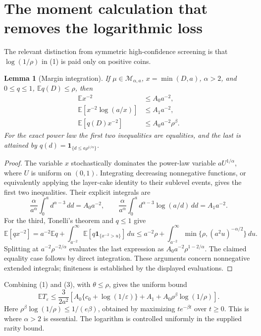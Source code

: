 \documentclass[11pt]{article}
\newtheorem{lemma}[theorem]{Lemma}
\newcommand{\E}{\mathbb E}
\newcommand{\ind}{\mathbf1}
\begin{document}
\section{The moment calculation that removes the logarithmic loss}
The relevant distinction from symmetric high-confidence screening is that
$\log(1/\rho)$ in (1) is paid only on positive coins.

\begin{lemma}[Margin integration]\label{lem:integration}
If $\mu\in\mathcal M_{\alpha,a}$, $x=\min(D,a)$, $\alpha>2$, and
$0\le q\le1$, $\E q(D)\le\rho$, then
\[
\begin{aligned}
 \E x^{-2}&\le A_0a^{-2},\\
 \E[x^{-2}\log(a/x)]&\le A_1a^{-2},\\
 \E[q(D)x^{-2}]&\le A_0a^{-2}\rho^\beta.
\end{aligned}                                           \tag{3}
\]
For the exact power law the first two inequalities are equalities, and the
last is attained by $q(d)=\ind_{\{d\le a\rho^{1/\alpha}\}}$.
\end{lemma}
\begin{proof}
The variable $x$ stochastically dominates the power-law variable $aU^{1/\alpha}$,
where $U$ is uniform on $(0,1)$. Integrating decreasing nonnegative functions,
or equivalently applying the layer-cake identity to their sublevel events,
gives the first two inequalities. Their explicit integrals are
\[
 \frac\alpha{a^\alpha}\int_0^a d^{\alpha-3}\,dd=A_0a^{-2},
 \qquad
 \frac\alpha{a^\alpha}\int_0^a d^{\alpha-3}\log(a/d)\,dd=A_1a^{-2}.
\]
For the third, Tonelli's theorem and $q\le1$ give
\[
 \E[qx^{-2}]
 =a^{-2}\E q+\int_{a^{-2}}^\infty\E[q\ind_{\{x^{-2}>u\}}]\,du
 \le a^{-2}\rho+\int_{a^{-2}}^\infty
                  \min\{\rho,(a^2u)^{-\alpha/2}\}\,du.
\]
Splitting at $a^{-2}\rho^{-2/\alpha}$ evaluates the last expression as
$A_0a^{-2}\rho^{1-2/\alpha}$. The claimed equality case follows by direct
integration. These arguments concern nonnegative extended integrals;
finiteness is established by the displayed evaluations.
\end{proof}

Combining (1) and (3), with $\theta\le\rho$, gives the uniform bound
\[
 \E T_\varepsilon\le\frac{3}{2a^2}
 \left[A_0\{c_0+\log(1/\varepsilon)\}+A_1
                  +A_0\rho^\beta\log(1/\rho)\right].     \tag{4}
\]
Here $\rho^\beta\log(1/\rho)\le1/(e\beta)$, obtained by maximizing
$te^{-\beta t}$ over $t\ge0$. This is where $\alpha>2$ is essential.
The logarithm is controlled uniformly in the supplied rarity bound.
\end{document}
